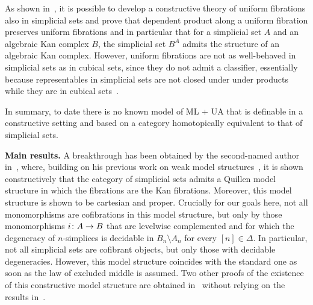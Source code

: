 \documentclass[reqno,10pt,a4paper,oneside,draft]{amsart}
\begin{document}
As shown in~\cite{gambino2017frobenius}, it is possible to develop  a constructive theory of uniform fibrations
also in simplicial sets and prove that dependent product along a uniform fibration preserves
uniform fibrations and in particular that for a simplicial set $A$ and an 
 algebraic Kan complex $B$, the simplicial set $B^A$ admits the structure of an algebraic Kan complex. However,  uniform fibrations
are not as well-behaved in simplicial sets as in cubical sets,
since they do not admit a classifier, essentially because 
representables  in simplicial sets are not closed under under products while they are in cubical sets~\cite{SattlerC:faiaut}. 

In summary, to date there is no known model of ML + UA that is definable in a constructive setting and
based on a category homotopically equivalent to that of simplicial sets. 

\smallskip

\noindent
\textbf{Main results.}
A breakthrough has been obtained  by the second-named author in~\cite{henry2019qms}, where, building on his previous work on weak model structures~\cite{henry2018wms},
it is shown constructively that the category of simplicial sets admits a Quillen model structure in which the
fibrations are the Kan fibrations. Moreover, this model structure is shown to be cartesian and proper.  Crucially for our goals here, not all monomorphisms are 
cofibrations in this model structure, but only by those monomorphisms $i \colon A \to B$ that are levelwise complemented 
and for which the degeneracy of $n$-simplices is decidable in $B_n \setminus A_n$ for every $[n] \in \Delta$. In particular, not all simplicial sets are cofibrant objects, but only those with decidable degeneracies. However, this model structure coincides with
the standard one as soon as the law of excluded middle is assumed. Two other  
proofs of the  existence of this constructive
model structure are obtained in~\cite{GambinoN:anocp} without relying on the results in~\cite{henry2018wms}. 
\end{document}
